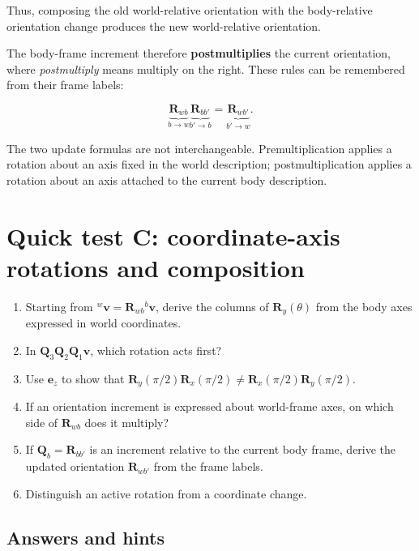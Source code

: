 \documentclass[
  australian,
  12pt,
  letterpaper,
  DIV=11,
  numbers=noendperiod,
  twoside]{scrreprt}
\providecommand{\tightlist}{%
  \setlength{\itemsep}{0pt}\setlength{\parskip}{0pt}}
\begin{document}
Thus, composing the old world-relative orientation with the
body-relative orientation change produces the new world-relative
orientation.

The body-frame increment therefore \textbf{postmultiplies} the current
orientation, where \emph{postmultiply} means multiply on the right.
These rules can be remembered from their frame labels:

\[
\underbrace{\mathbf R_{wb}}_{b\rightarrow w}
\underbrace{\mathbf R_{bb'}}_{b'\rightarrow b}
=
\underbrace{\mathbf R_{wb'}}_{b'\rightarrow w}.
\]

The two update formulas are not interchangeable. Premultiplication
applies a rotation about an axis fixed in the world description;
postmultiplication applies a rotation about an axis attached to the
current body description.

\section*{Quick test C: coordinate-axis rotations and
composition}\label{quick-test-c-coordinate-axis-rotations-and-composition}


\begin{enumerate}
\def\labelenumi{\arabic{enumi}.}
\tightlist
\item
  Starting from \({}^{w}\mathbf v=\mathbf R_{wb}{}^{b}\mathbf v\),
  derive the columns of \(\mathbf R_y(\theta)\) from the body axes
  expressed in world coordinates.
\item
  In \(\mathbf Q_3\mathbf Q_2\mathbf Q_1\mathbf v\), which rotation acts
  first?
\item
  Use \(\mathbf e_z\) to show that
  \(\mathbf R_y(\pi/2)\mathbf R_x(\pi/2)\ne\mathbf R_x(\pi/2)\mathbf R_y(\pi/2)\).
\item
  If an orientation increment is expressed about world-frame axes, on
  which side of \(\mathbf R_{wb}\) does it multiply?
\item
  If \(\mathbf Q_b=\mathbf R_{bb'}\) is an increment relative to the
  current body frame, derive the updated orientation \(\mathbf R_{wb'}\)
  from the frame labels.
\item
  Distinguish an active rotation from a coordinate change.
\end{enumerate}

\subsection*{Answers and hints}\label{answers-and-hints-17}
\end{document}
